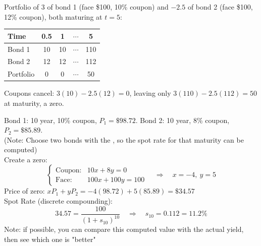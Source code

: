 \begin{example}
    Portfolio of 3 of bond 1 (face \$100, 10\% coupon) and $-2.5$ of bond 2 (face \$100, 12\% coupon), both maturing at $t=5$:
    \begin{center}
    \begin{tabular}{lcccc}
        \toprule
        Time & 0.5 & 1 & $\cdots$ & 5\\
        \midrule
        Bond 1 & 10 & 10 & $\cdots$ & 110\\
        Bond 2 & 12 & 12 & $\cdots$ & 112\\
        Portfolio & 0 & 0 & $\cdots$ & 50\\
        \bottomrule
    \end{tabular}
    \end{center}
    \begin{center}
    \end{center}
    Coupons cancel: $3(10) - 2.5(12) = 0$, leaving only $3(110) - 2.5(112) = 50$ at maturity, a zero.
\end{example}

\begin{example}
    Bond 1: 10 year, 10\% coupon, $P_1 = \$98.72$. Bond 2: 10 year, 8\% coupon, $P_2 = \$85.89$.
    \\(Note: Choose two bonds with the , so the spot rate for that maturity can be computed)
    \\Create a zero:
    \[\begin{cases}
        \text{Coupon:} & 10x + 8y = 0\\
        \text{Face:} & 100x + 100y = 100
    \end{cases} \quad \Rightarrow \quad x = -4,\ y = 5\]
    Price of zero: $xP_1 + yP_2 = -4(98.72) + 5(85.89) = \$34.57$
    \\Spot Rate (discrete compounding):
    \[34.57 = \frac{100}{(1+s_{10})^{10}} \quad \Rightarrow \quad s_{10} = 0.112 = 11.2\%\]
    Note: if possible, you can compare this computed value with the actual yield, then see which one is "better"
\end{example}


